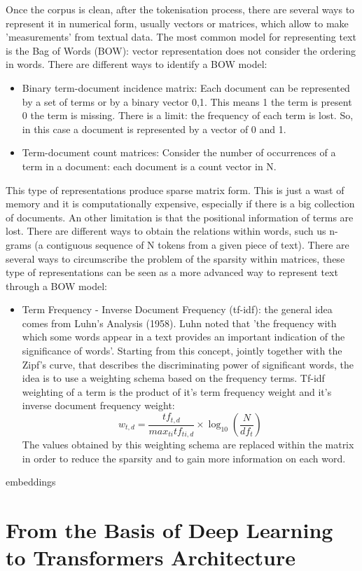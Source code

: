 Once the corpus is clean, after the tokenisation process, there are several ways to represent it in numerical form, usually vectors or matrices, which allow to make 'measurements' from textual data. The most common model for representing text is the Bag of Words (BOW): vector representation does not consider the ordering in words. There are different ways to identify a BOW model: 

\begin{itemize}
	\item Binary term-document incidence matrix: Each document can be represented by a set of terms or by a binary vector {0,1}. This means 1 the term is present 0 the term is missing. There is a limit: the frequency of each term is lost. So, in this case a document is represented by a vector of 0 and 1.
	\item Term-document count matrices: Consider the number of occurrences of a term in a document: each document is a count vector in N.
\end{itemize}

This type of representations produce sparse matrix form. This is just a wast of memory and it is computationally expensive, especially if there is a big collection of documents. An other limitation is that the positional information of terms are lost. There are different ways to obtain the relations within words, such us n-grams (a contiguous sequence of N tokens from a given piece of text). 
There are several ways to circumscribe the problem of the sparsity within matrices, these type of representations can be seen as a more advanced way to represent text through a BOW model: 
\begin{itemize}
	\item Term Frequency - Inverse Document Frequency (tf-idf): the general idea comes from Luhn's Analysis (1958). Luhn noted that 'the frequency with which some words appear in a text provides an important indication of the significance of words'. Starting from this concept, jointly together with the Zipf's curve, that describes the discriminating power of significant words, the idea is to use a weighting schema based on the frequency terms. Tf-idf weighting of a term is the product of it's term frequency weight and it's inverse document frequency weight:
	\begin{equation}
		w_{t,d}= \frac{tf_{t,d}}{max_{ti}tf_{ti,d}}\times\log_{10}(\frac{N}{df_t})
		\label{eq:tfidf}
	\end{equation}
	The values obtained by this weighting schema are replaced within the matrix in order to reduce the sparsity and to gain more information on each word. 
\end{itemize}
embeddings

\section{From the Basis of Deep Learning to Transformers Architecture}
